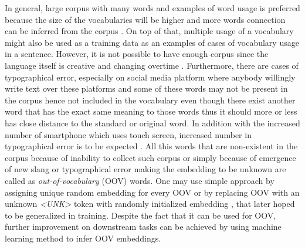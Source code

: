     In general, large corpus with many words and examples of word
    usage is preferred because the size of the vocabularies will be
    higher and more words connection can be inferred from the corpus
    \citep{size2018kutuzov}. On top of that, multiple usage of a
    vocabulary might also be used as a training data as an examples of
    cases of vocabulary usage in a sentence. However, it is not
    possible to have enough corpus since the language itself is
    creative and changing overtime \citep{forrester2008abrief,
    speech2009Jurafsky:2009:SLP:1214993}. Furthermore, there are cases
    of typographical error, especially on social media platform where
    anybody willingly write text over these platforms
    \citep{Liu2010SentimentAA} and some of these words may not be
    present in the corpus hence not included in the vocabulary even
    though there exist another word that has the exact same meaning to
    those words thus it should more or less has close distance to the
    standard or original word\citep{mapping2012eisenstein}. In
    addition with the increased number of smartphone which uses touch
    screen, increased number in typographical error is to be expected
    \citep{ghosh2017correction}. All this words that are non-existent
    in the corpus because of inability to collect such corpus or
    simply because of emergence of new slang or typographical error
    making the embedding to be unknown are called as
    \textit{out-of-vocabulary} (OOV) words. One may use simple
    approach by assigning unique random embedding for every OOV or by
    replacing OOV with an unknown \textit{\textless UNK\textgreater}
    token with randomly initialized embedding
    \citep{predicting2019garneau}, that later hoped to be generalized
    in training. Despite the fact that it can be used for OOV, further
    improvement on downstream tasks can be achieved by using machine
    learning method to infer OOV embeddings.

